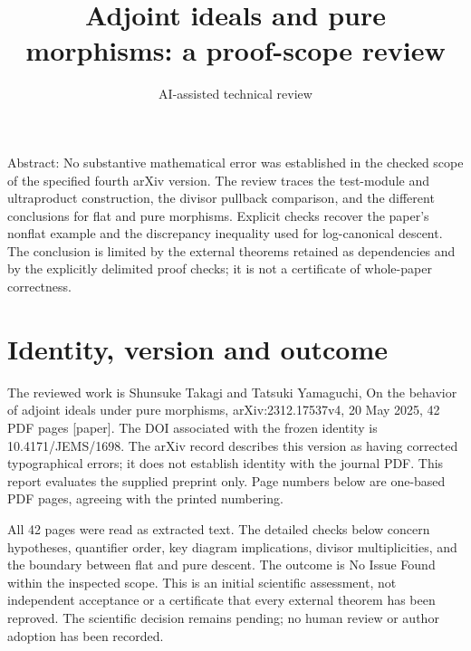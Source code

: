 \documentclass[10pt]{article}
\title{Adjoint ideals and pure morphisms: a proof-scope review}
\author{AI-assisted technical review}
\date{}
\begin{document}
\maketitle
Abstract: No substantive mathematical error was established in the checked scope of the specified fourth arXiv version. The review traces the test-module and ultraproduct construction, the divisor pullback comparison, and the different conclusions for flat and pure morphisms. Explicit checks recover the paper’s nonflat example and the discrepancy inequality used for log-canonical descent. The conclusion is limited by the external theorems retained as dependencies and by the explicitly delimited proof checks; it is not a certificate of whole-paper correctness.\par
\section*{Identity, version and outcome}
The reviewed work is Shunsuke Takagi and Tatsuki Yamaguchi, On the behavior of adjoint ideals under pure morphisms, arXiv:2312.17537v4, 20 May 2025, 42 PDF pages [paper]. The DOI associated with the frozen identity is 10.4171/JEMS/1698. The arXiv record describes this version as having corrected typographical errors; it does not establish identity with the journal PDF. This report evaluates the supplied preprint only. Page numbers below are one-based PDF pages, agreeing with the printed numbering.\par
All 42 pages were read as extracted text. The detailed checks below concern hypotheses, quantifier order, key diagram implications, divisor multiplicities, and the boundary between flat and pure descent. The outcome is No Issue Found within the inspected scope. This is an initial scientific assessment, not independent acceptance or a certificate that every external theorem has been reproved. The scientific decision remains pending; no human review or author adoption has been recorded.\par
\end{document}
